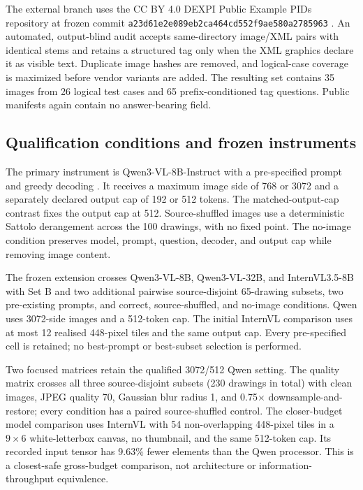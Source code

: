 \documentclass[11pt]{article}
\begin{document}
The external branch uses the CC BY 4.0 DEXPI Public Example PIDs repository at
frozen commit \texttt{a23d61e2e089eb2ca464cd552f9ae580a2785963}
\cite{dexpi2024}. An automated, output-blind audit accepts same-directory
image/XML pairs with identical stems and retains a structured tag only when
the XML graphics declare it as visible text. Duplicate image hashes are
removed, and logical-case coverage is maximized before vendor variants are
added. The resulting set contains 35 images from 26 logical test cases and 65
prefix-conditioned tag questions. Public manifests again contain no
answer-bearing field.

\subsection{Qualification conditions and frozen instruments}

The primary instrument is Qwen3-VL-8B-Instruct with a pre-specified prompt and
greedy decoding \cite{bai2025}. It receives a maximum image side of 768 or
3072 and a separately declared output cap of 192 or 512 tokens. The
matched-output-cap contrast fixes the output cap at 512. Source-shuffled images
use a deterministic Sattolo derangement across the 100 drawings, with no fixed
point. The no-image condition preserves model, prompt, question, decoder, and
output cap while removing image content.

The frozen extension crosses Qwen3-VL-8B, Qwen3-VL-32B, and
InternVL3.5-8B \cite{wang2025} with Set B and two additional pairwise
source-disjoint 65-drawing subsets, two pre-existing prompts, and correct,
source-shuffled, and no-image conditions. Qwen uses 3072-side images and a
512-token cap. The initial InternVL comparison uses at most 12 realised
448-pixel tiles and the same output cap. Every pre-specified cell is retained;
no best-prompt or best-subset selection is performed.

Two focused matrices retain the qualified 3072/512 Qwen setting. The quality
matrix crosses all three source-disjoint subsets (230 drawings in total) with
clean images, JPEG quality 70, Gaussian blur radius 1, and 0.75$\times$
downsample-and-restore; every condition has a paired source-shuffled control.
The closer-budget model comparison uses InternVL with 54 non-overlapping
448-pixel tiles in a $9\times6$ white-letterbox canvas, no thumbnail, and the
same 512-token cap. Its recorded input tensor has 9.63\% fewer elements than
the Qwen processor. This is a closest-safe gross-budget comparison, not
architecture or information-throughput equivalence.
\end{document}
